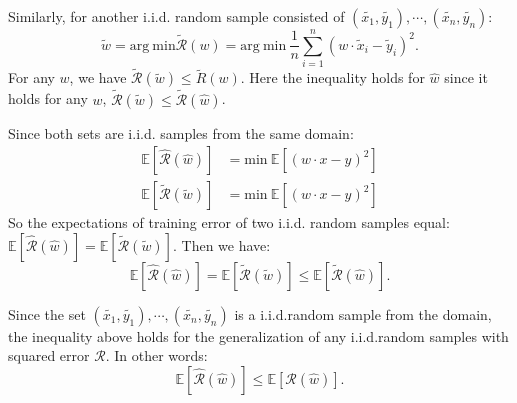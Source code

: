 \documentclass[twoside,11pt]{homework}
\begin{document}
Similarly, for another i.i.d. random sample consisted of $(\tilde{x_1}, \tilde{y_1}), \cdots, (\tilde{x_n}, \tilde{y_n})$:
\begin{equation}
  \tilde{w} = \mathrm{arg\ min} \tilde{\mathcal{R}}(w) = \mathrm{arg\ min}\ \frac{1}{n} \sum_{i=1}^n (w \cdot \tilde{x}_i - \tilde{y}_i)^2.   
\end{equation}
 For any $w$, we have $\tilde{\mathcal{R}}(\tilde{w}) \le \tilde{R}(w) $.%
Here the inequality holds for $\hat{w}$ since it holds for any $w$,  $\tilde{\mathcal{R}}(\tilde{w}) \le \tilde{\mathcal{R}}(\hat{w})$.

Since both sets are i.i.d. samples from the same domain:
\begin{equation}
\begin{split}
   \mathbb{E}[\hat{\mathcal{R}}(\hat{w})] &= \mathrm{min}\ \mathbb{E} [(w \cdot x - y)^2]  \\
   \mathbb{E}[\tilde{\mathcal{R}}(\tilde{w})] &= \mathrm{min}\ \mathbb{E} [(w \cdot x - y)^2]
\end{split}
\end{equation}
So the expectations of training error of two i.i.d. random samples equal:
$\mathbb{E}[\hat{\mathcal{R}}(\hat{w})] = \mathbb{E}[\tilde{\mathcal{R}}(\tilde{w})]$.    
Then we have:
\begin{equation}
    \mathbb{E}[\hat{\mathcal{R}}(\hat{w})] = \mathbb{E}[\tilde{\mathcal{R}}(\tilde{w})] \le \mathbb{E}[\tilde{\mathcal{R}}(\hat{w})].
\end{equation}

Since the set $(\tilde{x_1}, \tilde{y_1}), \cdots, (\tilde{x_n}, \tilde{y_n})$ is a i.i.d.random sample from the domain, the inequality above holds for the generalization of any i.i.d.random samples with squared error $\mathcal{R}$.
In other words:
\begin{equation}
    \mathbb{E}[\hat{\mathcal{R}}(\hat{w})]  \le \mathbb{E}[\mathcal{R} (\hat{w})].
\end{equation}
\end{document}
